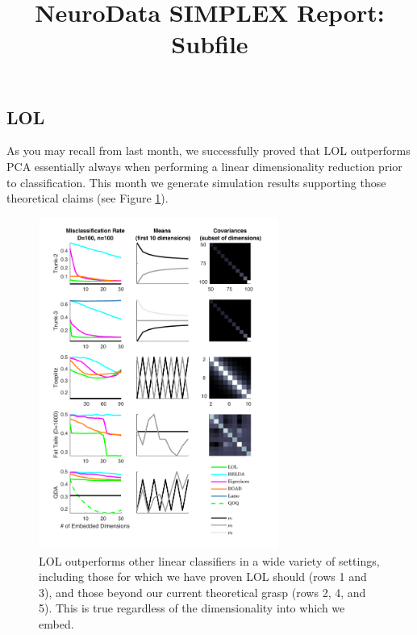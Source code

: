 \documentclass[simplex.tex]{subfiles}
\title{NeuroData SIMPLEX Report: Subfile}
\begin{document}
\onlyinsubfile{
\thispagestyle{empty}



\begin{spacing}{0.5}
\nocite{*}
{\footnotesize	}
\end{spacing}
}

\subsection{LOL}



As you may recall from last month, we successfully proved that LOL outperforms PCA essentially always when performing a linear dimensionality reduction prior to classification.  This month we generate simulation results supporting those theoretical claims (see Figure \ref{fig:LOL}).



\begin{figure}[h!]
\begin{cframed}
\centering
\includegraphics[width=0.7\textwidth]{../../figs/plot_all.pdf}
\caption{
LOL outperforms other linear classifiers in a wide variety of settings, including those for which we have proven LOL should (rows 1 and 3), and those beyond our current theoretical grasp (rows 2, 4, and 5). This is true regardless of the dimensionality into which we embed.
}
\label{fig:LOL}
\end{cframed}
\end{figure}
\end{document}
